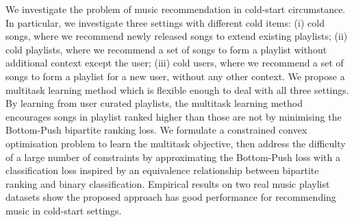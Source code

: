 We investigate the problem of music recommendation in cold-start circumstance.
In particular, we investigate three settings with different cold items:
(i) cold songs, where we recommend newly released songs to extend existing playlists;
(ii) cold playlists, where we recommend a set of songs to form a playlist without additional context except the user;
(iii) cold users, where we recommend a set of songs to form a playlist for a new user, without any other context.
We propose a multitask learning method which is flexible enough to deal with all three settings.
By learning from user curated playlists, the multitask learning method encourages songs in playlist 
ranked higher than those are not by minimising the Bottom-Push bipartite ranking loss.
We formulate a constrained convex optimisation problem to learn the multitask objective,
then address the difficulty of a large number of constraints by approximating the Bottom-Push loss
with a classification loss inspired by an equivalence relationship between bipartite ranking and binary classification.
Empirical results on two real music playlist datasets show the proposed approach has good performance for recommending music 
in cold-start settings.
